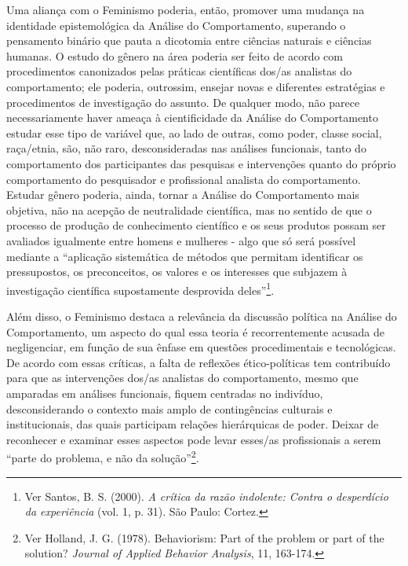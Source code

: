 Uma aliança com o Feminismo poderia, então, promover uma mudança na identidade epistemológica da Análise do Comportamento, superando o pensamento binário que pauta a dicotomia entre ciências naturais e ciências humanas. O estudo do gênero na área poderia ser feito de acordo com procedimentos canonizados pelas práticas científicas dos/as analistas do comportamento; ele poderia, outrossim, ensejar novas e diferentes estratégias e procedimentos de investigação do assunto. De qualquer modo, não parece necessariamente haver ameaça à cientificidade da Análise do Comportamento estudar esse tipo de variável que, ao lado de outras, como poder, classe social, raça/etnia, são, não raro, desconsideradas nas análises funcionais, tanto do comportamento dos participantes das pesquisas e intervenções quanto do próprio comportamento do pesquisador e profissional analista do comportamento. Estudar gênero poderia, ainda, tornar a Análise do Comportamento mais objetiva, não na acepção de neutralidade científica, mas no sentido de que o processo de produção de conhecimento científico e os seus produtos possam ser avaliados igualmente entre homens e mulheres - algo que só será possível mediante a ``aplicação sistemática de métodos que permitam identificar os pressupostos, os preconceitos, os valores e os interesses que subjazem à investigação científica supostamente desprovida deles''\footnote{Ver Santos, B. S. (2000). \emph{A crítica da razão indolente: Contra o desperdício da experiência} (vol. 1, p. 31). São Paulo: Cortez.}.

Além disso, o Feminismo destaca a relevância da discussão política na Análise do Comportamento, um aspecto do qual essa teoria é recorrentemente acusada de negligenciar, em função de sua ênfase em questões procedimentais e tecnológicas. De acordo com essas críticas, a falta de reflexões ético-políticas tem contribuído para que as intervenções dos/as analistas do comportamento, mesmo que amparadas em análises funcionais, fiquem centradas no indivíduo, desconsiderando o contexto mais amplo de contingências culturais e institucionais, das quais participam relações hierárquicas de poder. Deixar de reconhecer e examinar esses aspectos pode levar esses/as profissionais a serem “parte do problema, e não da solução”\footnote{Ver Holland, J. G. (1978). Behaviorism: Part of the problem or part of the solution? \emph{Journal of Applied Behavior Analysis}, 11, 163-174.}.


